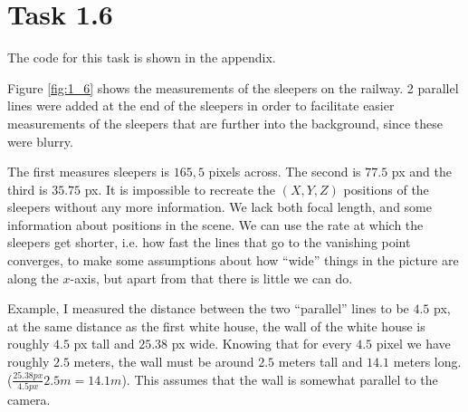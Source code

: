 \section{Task 1.6}
The code for this task is shown in the appendix.


Figure \ref{fig:1_6} shows the measurements of the sleepers on the railway. 2 parallel lines were
added at the end of the sleepers in order to facilitate easier measurements of the sleepers that are
further into the background, since these were blurry.

The first measures sleepers is $165,5$ pixels across. The second is $77.5$ px and the third is
$35.75$ px. It is impossible to recreate the $(X,Y,Z)$ positions of the sleepers without any more information.
We lack both focal length, and some information about positions in the scene. We can use the rate at
which the sleepers get shorter, i.e. how fast the lines that go to the vanishing point converges, to
make some assumptions about how ``wide'' things in the picture are along the $x$-axis, but apart from
that there is little we can do.

Example, I measured the distance between the two ``parallel'' lines to be $4.5$ px, at the same
distance as the first white house, the wall of the white house is roughly $4.5$ px tall and $25.38$ px wide.
Knowing that for every $4.5$ pixel we have roughly $2.5$ meters, the wall must be around $2.5$ meters
tall and $14.1$ meters long. ($\frac{25.38px}{4.5px}2.5m = 14.1m$). This assumes that the wall is
somewhat parallel to the camera.